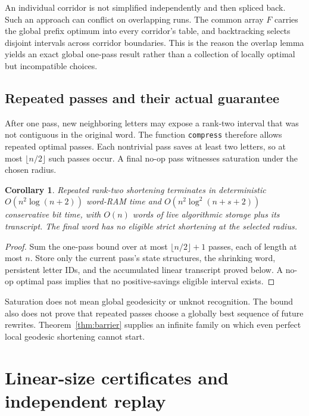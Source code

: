 \documentclass[11pt]{article}
\newtheorem{corollary}[theorem]{Corollary}
\theoremstyle{definition}
\theoremstyle{remark}
\begin{document}
An individual corridor is not simplified independently and then spliced
back. Such an approach can conflict on overlapping runs. The common array
$F$ carries the global prefix optimum into every corridor's table, and
backtracking selects disjoint intervals across corridor boundaries. This is
the reason the overlap lemma yields an exact global one-pass result rather
than a collection of locally optimal but incompatible choices.

\subsection{Repeated passes and their actual guarantee}
After one pass, new neighboring letters may expose a rank-two interval that
was not contiguous in the original word. The function \texttt{compress}
therefore allows repeated optimal passes. Each nontrivial pass saves at
least two letters, so at most $\lfloor n/2\rfloor$ such passes occur. A final
no-op pass witnesses saturation under the chosen radius.

\begin{corollary}\label{cor:repeat}
Repeated rank-two shortening terminates in deterministic
$O(n^2\log(n+2))$ word-RAM time and $O(n^2\log^2(n+s+2))$ conservative bit
time, with $O(n)$ words of live algorithmic storage plus its transcript.
The final word has no eligible strict shortening at the selected radius.
\end{corollary}
\begin{proof}
Sum the one-pass bound over at most $\lfloor n/2\rfloor+1$ passes, each of
length at most $n$. Store only the current pass's state structures, the
shrinking word, persistent letter IDs, and the accumulated linear transcript
proved below. A no-op optimal pass implies that no positive-savings eligible
interval exists.
\end{proof}

Saturation does not mean global geodesicity or unknot recognition. The bound
also does not prove that repeated passes choose a globally best sequence of
future rewrites. Theorem~\ref{thm:barrier} supplies an infinite family on which
even perfect local geodesic shortening cannot start.

\section{Linear-size certificates and independent replay}
\end{document}
